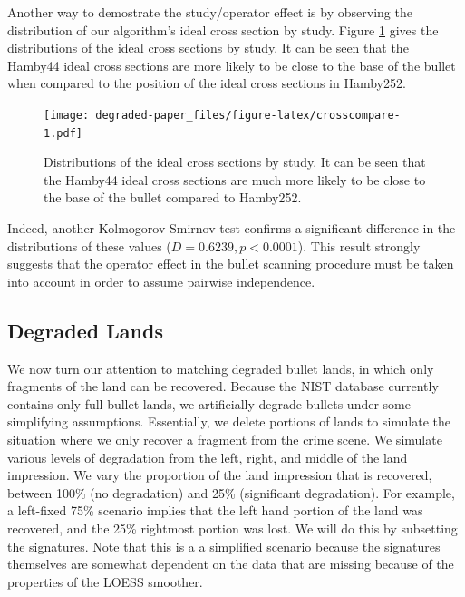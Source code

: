 \documentclass[12pt,]{article}
\theoremstyle{definition}
\theoremstyle{definition}
\theoremstyle{definition}
\theoremstyle{remark}
\begin{document}
Another way to demostrate the study/operator effect is by observing the
distribution of our algorithm's ideal cross section by study. Figure
\ref{fig:crosscompare} gives the distributions of the ideal cross
sections by study. It can be seen that the Hamby44 ideal cross sections
are more likely to be close to the base of the bullet when compared to
the position of the ideal cross sections in Hamby252.

\begin{figure}[htbp]
\centering
\texttt{[image: degraded-paper\_files/figure-latex/crosscompare-1.pdf]}
\caption{\label{fig:crosscompare}Distributions of the ideal cross sections
by study. It can be seen that the Hamby44 ideal cross sections are much
more likely to be close to the base of the bullet compared to Hamby252.}
\end{figure}

Indeed, another Kolmogorov-Smirnov test confirms a significant
difference in the distributions of these values
(\(D = 0.6239, p < 0.0001\)). This result strongly suggests that the
operator effect in the bullet scanning procedure must be taken into
account in order to assume pairwise independence.

\subsection{Degraded Lands}\label{degraded-lands}

We now turn our attention to matching degraded bullet lands, in which
only fragments of the land can be recovered. Because the NIST database
currently contains only full bullet lands, we artificially degrade
bullets under some simplifying assumptions. Essentially, we delete
portions of lands to simulate the situation where we only recover a
fragment from the crime scene. We simulate various levels of degradation
from the left, right, and middle of the land impression. We vary the
proportion of the land impression that is recovered, between 100\% (no
degradation) and 25\% (significant degradation). For example, a
left-fixed 75\% scenario implies that the left hand portion of the land
was recovered, and the 25\% rightmost portion was lost. We will do this
by subsetting the signatures. Note that this is a a simplified scenario
because the signatures themselves are somewhat dependent on the data
that are missing because of the properties of the LOESS smoother.
\end{document}
